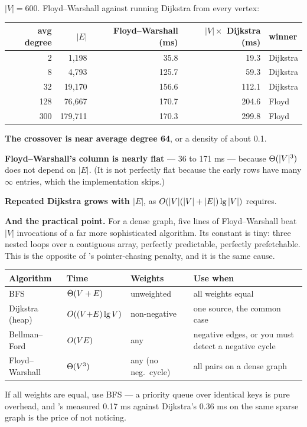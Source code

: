 \begin{worked}
$|V| = 600$. Floyd--Warshall against running Dijkstra from every vertex:

\begin{center}
\begin{tabular}{@{}rrrrl@{}}
\toprule
\rowcolor{primary!15}
avg degree & $|E|$ & Floyd--Warshall (ms) & $|V| \times$ Dijkstra (ms) & winner \\
\midrule
  2 &   1{,}198 &  35.8 &  19.3 & Dijkstra \\
  8 &   4{,}793 & 125.7 &  59.3 & Dijkstra \\
 32 &  19{,}170 & 156.6 & 112.1 & Dijkstra \\
128 &  76{,}667 & 170.7 & 204.6 & Floyd \\
300 & 179{,}711 & 170.3 & 299.8 & Floyd \\
\bottomrule
\end{tabular}
\end{center}

\smallskip
\textbf{The crossover is near average degree 64}, or a density of about 0.1.

\smallskip
\textbf{Floyd--Warshall's column is nearly flat} --- 36 to 171 ms --- because
$\Theta(|V|^{3})$ does not depend on $|E|$. (It is not perfectly flat because
the early rows have many $\infty$ entries, which the implementation skips.)

\smallskip
\textbf{Repeated Dijkstra grows with $|E|$}, as $O(|V|(|V|+|E|)\operatorname{lg}|V|)$
requires.

\smallskip
\textbf{And the practical point.} For a dense graph, five lines of
Floyd--Warshall beat $|V|$ invocations of a far more sophisticated algorithm.
Its constant is tiny: three nested loops over a contiguous array, perfectly
predictable, perfectly prefetchable. This is the opposite of
's pointer-chasing penalty, and it is the same cause.
\end{worked}

\begin{conceptbox}[Choosing]
\begin{longtable}{@{}L{3.4cm}L{3.0cm}L{3.0cm}L{4.4cm}@{}}
\toprule
{}
\textbf{Algorithm} & \textbf{Time} & \textbf{Weights} & \textbf{Use when} \\
\midrule
\endhead
BFS & $\Theta(V+E)$ & unweighted & all weights equal \\
Dijkstra (heap) & $O((V{+}E)\operatorname{lg} V)$ & non-negative & one source, the
  common case \\
Bellman--Ford & $O(VE)$ & any & negative edges, or you must detect a
  negative cycle \\
Floyd--Warshall & $\Theta(V^{3})$ & any (no neg.\ cycle) & all pairs on a
  dense graph \\
\bottomrule
\end{longtable}

\smallskip
If all weights are equal, use BFS --- a priority queue over identical keys is
pure overhead, and 's measured 0.17 ms against Dijkstra's 0.36 ms
on the same sparse graph is the price of not noticing.
\end{conceptbox}

